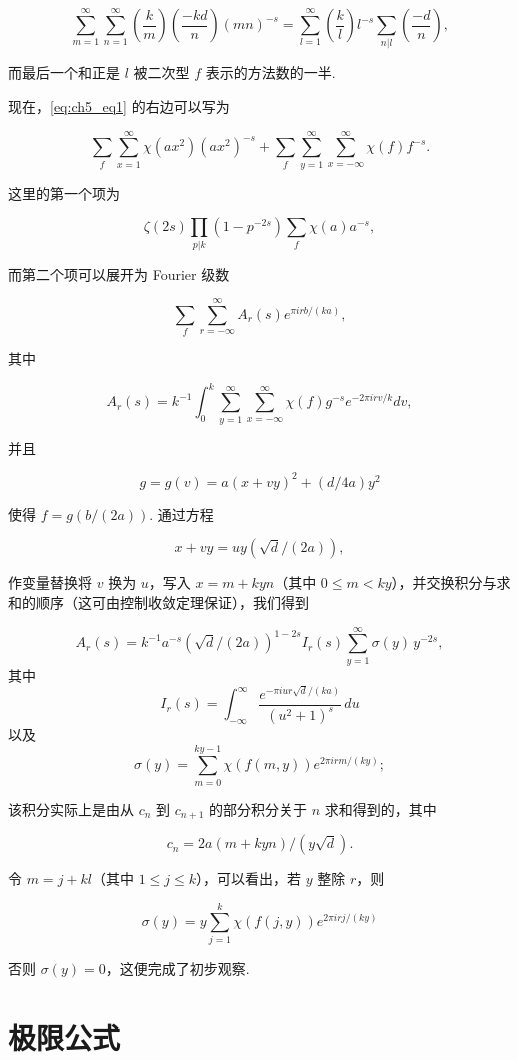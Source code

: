 \[\sum_{m=1}^{\infty}\sum_{n=1}^{\infty}\left(\frac{k}{m}\right)\left(\frac{-kd}{n}\right)(mn)^{-s}=\sum_{l=1}^{\infty}\left(\frac{k}{l}\right)l^{-s}\sum_{n|l}\left(\frac{-d}{n}\right),\]

而最后一个和正是 $l$ 被二次型 $f$ 表示的方法数的一半.

现在，\eqref{eq:ch5_eq1} 的右边可以写为

\[\sum_{f} \sum_{x=1}^{\infty} \chi(ax^2) (ax^2)^{-s} + \sum_{f} \sum_{y=1}^{\infty} \sum_{x=-\infty}^{\infty} \chi(f) f^{-s}.\]

这里的第一个项为

\[\zeta(2s) \prod_{p|k} (1-p^{-2s}) \sum_{f} \chi(a) a^{-s},\]

而第二个项可以展开为 Fourier 级数

\[\sum_{f} \sum_{r=-\infty}^{\infty} A_r(s) e^{\pi i r b/(ka)},\]

其中

\[A_r(s) = k^{-1} \int_0^k \sum_{y=1}^{\infty} \sum_{x=-\infty}^{\infty} \chi(f) g^{-s} e^{-2\pi i r v/k} dv,\]

并且

\[g = g(v) = a(x+vy)^2 + (d/4a)y^2\]

使得 $f = g(b/(2a))$. 通过方程

\[x+vy=uy(\sqrt{d}/(2a)),\]

作变量替换将 $v$ 换为 $u$，写入 $x = m + kyn$（其中 $0 \le m < ky$），并交换积分与求和的顺序（这可由控制收敛定理保证），我们得到

\[ A_r(s) = k^{-1} a^{-s} (\sqrt{d}/(2a))^{1-2s} I_r(s) \sum_{y=1}^{\infty} \sigma(y) \, y^{-2s}, \]
其中
\[ I_r(s) = \int_{-\infty}^{\infty} \frac{e^{-\pi i u r \sqrt{d}/(ka)}}{(u^2+1)^s} \, du \]
以及
\[\sigma(y) = \sum_{m=0}^{ky-1} \chi(f(m,y)) e^{2\pi i r m/(ky)};\]

该积分实际上是由从 $c_n$ 到 $c_{n+1}$ 的部分积分关于 $n$ 求和得到的，其中

\[c_n = 2a(m + kyn)/(y\sqrt{d}).\]

令 $m = j + kl$（其中 $1 \le j \le k$），可以看出，若 $y$ 整除 $r$，则

\[\sigma(y) = y \sum_{j=1}^{k} \chi(f(j,y)) e^{2\pi i r j/(ky)}\]

否则 $\sigma(y) = 0$，这便完成了初步观察.

\section{极限公式}\label{sec:ch5_3}

